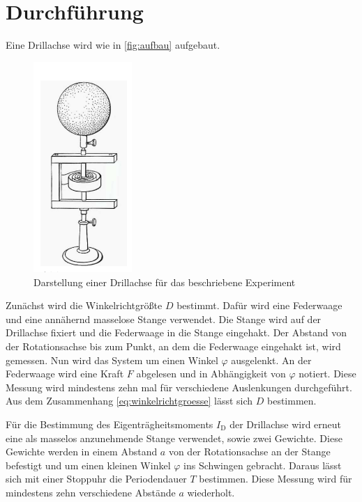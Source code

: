 \section{Durchführung}
\label{sec:Durchführung}

Eine Drillachse wird wie in \autoref{fig:aufbau} aufgebaut.

\begin{figure}
    \centering
    \includegraphics[height=8cm]{images/aufbau.png}
    \caption{Darstellung einer Drillachse für das beschriebene Experiment \cite{V101}}
    \label{fig:aufbau}
\end{figure}

Zunächst wird die Winkelrichtgrößte $D$ bestimmt. 
Dafür wird eine Federwaage und eine annähernd masselose Stange verwendet.
Die Stange wird auf der Drillachse fixiert und die Federwaage in die Stange eingehakt. 
Der Abstand von der Rotationsachse bis zum Punkt, an dem die Federwaage eingehakt ist, wird gemessen.
Nun wird das System um einen Winkel $\varphi$ ausgelenkt. 
An der Federwaage wird eine Kraft $F$ abgelesen und in Abhängigkeit von $\varphi$ notiert. 
Diese Messung wird mindestens zehn mal für verschiedene Auslenkungen durchgeführt. 
Aus dem Zusammenhang \autoref{eq:winkelrichtgroesse} lässt sich $D$ bestimmen.

Für die Bestimmung des Eigenträgheitsmoments $I_\text{D}$ der Drillachse wird erneut eine als masselos anzunehmende Stange verwendet, sowie zwei Gewichte.
Diese Gewichte werden in einem Abstand $a$ von der Rotationsachse an der Stange befestigt und um einen kleinen Winkel $\varphi$ ins Schwingen gebracht. 
Daraus lässt sich mit einer Stoppuhr die Periodendauer $T$ bestimmen. 
Diese Messung wird für mindestens zehn verschiedene Abstände $a$ wiederholt. 

